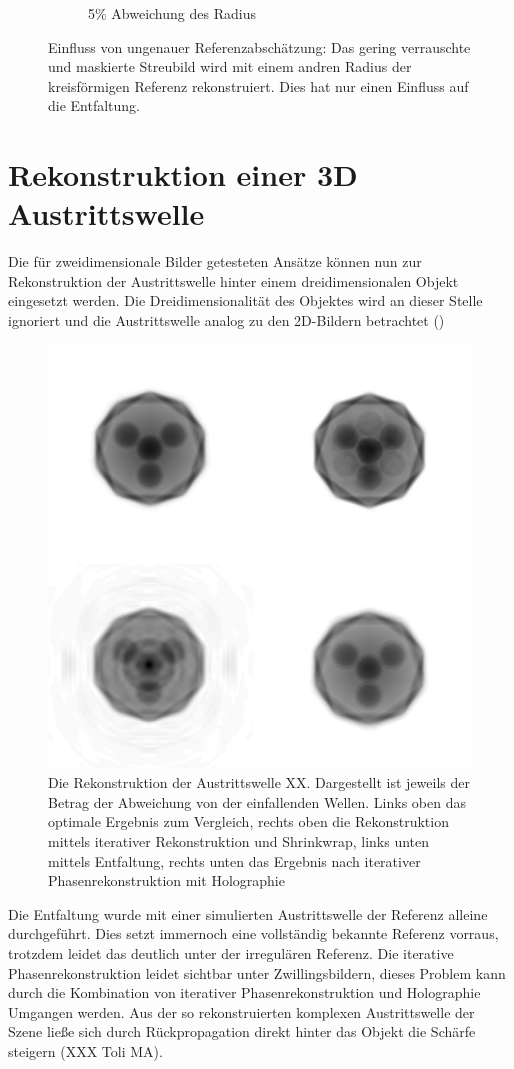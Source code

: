 \begin{figure}
\begin{subfigure}[b]{0.45\textwidth}
		\caption{5\% Abweichung des Radius}	
	\end{subfigure}
	\caption[2D Rekonstruktion: Referenz]{Einfluss von ungenauer Referenzabschätzung: Das gering verrauschte und maskierte Streubild wird mit einem andren Radius der kreisförmigen Referenz rekonstruiert. Dies hat nur einen Einfluss auf die Entfaltung.}
\end{figure}
\section{Rekonstruktion einer 3D Austrittswelle}
Die für zweidimensionale Bilder getesteten Ansätze können nun zur Rekonstruktion der Austrittswelle hinter einem dreidimensionalen Objekt eingesetzt werden. Die Dreidimensionalität des Objektes wird an dieser Stelle ignoriert und die Austrittswelle analog zu den 2D-Bildern betrachtet ()

\begin{figure}
		\includegraphics[width=\textwidth]{images/recon3d.png}
	\caption[Rekonstruktion einer Austrittswelle]{Die Rekonstruktion der Austrittswelle XX. Dargestellt ist jeweils der Betrag der Abweichung von der einfallenden Wellen. Links oben das optimale Ergebnis zum Vergleich, rechts oben die Rekonstruktion mittels iterativer Rekonstruktion und Shrinkwrap, links unten mittels Entfaltung, rechts unten das Ergebnis nach iterativer Phasenrekonstruktion mit Holographie}
	\label{fig:recon3d}
\end{figure}	
Die Entfaltung wurde mit einer simulierten Austrittswelle der Referenz alleine durchgeführt. Dies setzt immernoch eine vollständig bekannte Referenz vorraus, trotzdem leidet das deutlich unter der irregulären Referenz. Die iterative Phasenrekonstruktion leidet sichtbar unter Zwillingsbildern, dieses Problem kann durch die Kombination von iterativer Phasenrekonstruktion und Holographie Umgangen werden. 
Aus der so rekonstruierten komplexen Austrittswelle der Szene ließe sich durch Rückpropagation direkt hinter das Objekt die Schärfe steigern (XXX Toli MA).

